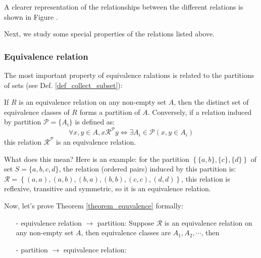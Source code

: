 A clearer representation of the relationships between the different relations is shown in Figure .

Next, we study some special properties of the relations listed above.

\subsubsection*{Equivalence relation}
The most important property of equivalence ralations is related to the partitions of sets (see Def. \ref{def_collect_subset}):
\begin{theorem}\label{theorem_equvalence}
    If $R$ is an equivalence relation on any non-empty set $A$, then the distinct set of equivalence classes of $R$ forms a partition of $A$.
    Conversely, if a relation induced by partition $\mathcal{P}=\{A_i\}$ is defined as:
    $$
    \forall x,y\in A, x\mathcal{R}^{\mathcal{P}}y \Leftrightarrow \exists A_i \in \mathcal{P}(x,y\in A_i)
    $$
    this relation $\mathcal{R}^{\mathcal{P}}$ is an equivalence relation.
\end{theorem}

What does this mean? Here is an example: for the partition $\left\{\{a,b\},\{c\},\{d\}\right\}$ of set $S=\{a,b,c,d\}$, the relation (ordered pairs) induced by this partition 
is: $\mathcal{R}=\left\{(a,a),(a,b),(b,a),(b,b),(c,c),(d,d)\right\}$, this relation is reflexive, transitive and symmetric, so it is an equivalence relation.

Now, let's prove Theorem \ref{theorem_equvalence} formally:
\begin{enumerate}
    \item[-] equivalence relation $\rightarrow$ partition:
    Suppose $\mathcal{R}$ is an equivalence relation on any non-empty set $A$, then equivalence classes are $A_1,A_2,\cdots$, then 
    \item[-] partition $\rightarrow$ equivalence relation:
\end{enumerate}